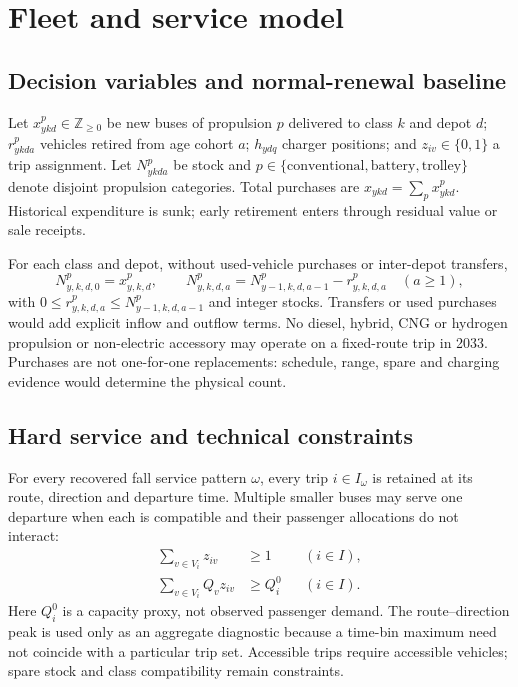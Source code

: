\documentclass[12pt,letterpaper]{article}
\begin{document}
\section{Fleet and service model}
\subsection{Decision variables and normal-renewal baseline}
Let $x^p_{ykd}\in\mathbb Z_{\ge0}$ be new buses of propulsion $p$ delivered to class $k$ and depot $d$; $r^p_{ykda}$ vehicles retired from age cohort $a$; $h_{ydq}$ charger positions; and $z_{iv}\in\{0,1\}$ a trip assignment. Let $N^p_{ykda}$ be stock and $p\in\{\mathrm{conventional},\mathrm{battery},\mathrm{trolley}\}$ denote disjoint propulsion categories. Total purchases are $x_{ykd}=\sum_p x^p_{ykd}$. Historical expenditure is sunk; early retirement enters through residual value or sale receipts.

For each class and depot, without used-vehicle purchases or inter-depot transfers,
\begin{equation}
 N^p_{y,k,d,0}=x^p_{y,k,d},\qquad
 N^p_{y,k,d,a}=N^p_{y-1,k,d,a-1}-r^p_{y,k,d,a}\quad(a\ge1),
\end{equation}
with $0\le r^p_{y,k,d,a}\le N^p_{y-1,k,d,a-1}$ and integer stocks. Transfers or used purchases would add explicit inflow and outflow terms. No diesel, hybrid, CNG or hydrogen propulsion or non-electric accessory may operate on a fixed-route trip in 2033. Purchases are not one-for-one replacements: schedule, range, spare and charging evidence would determine the physical count.

\subsection{Hard service and technical constraints}
For every recovered fall service pattern $\omega$, every trip $i\in I_\omega$ is retained at its route, direction and departure time. Multiple smaller buses may serve one departure when each is compatible and their passenger allocations do not interact:
\begin{align}
 \sum_{v\in V_i}z_{iv}&\geq 1 &&(i\in I),\\
 \sum_{v\in V_i}Q_vz_{iv}&\geq Q_i^0 &&(i\in I).
\end{align}
Here $Q_i^0$ is a capacity proxy, not observed passenger demand. The route--direction peak is used only as an aggregate diagnostic because a time-bin maximum need not coincide with a particular trip set. Accessible trips require accessible vehicles; spare stock and class compatibility remain constraints.
\end{document}
